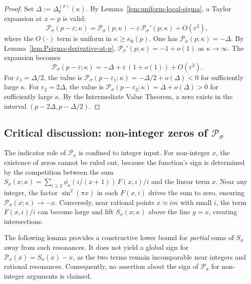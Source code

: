 \documentclass[11pt,a4paper]{amsart}
\theoremstyle{plain}
\theoremstyle{definition}
\theoremstyle{remark}
\begin{document}
\begin{proof}
Set $\Delta:=\Delta_p^{(\sigma)}(\kappa)$. By Lemma~\ref{lem:uniform-local-sigma}, a Taylor expansion at $x=p$ is valid:
\[
\mathcal P_\sigma(p-\varepsilon;\kappa)=\mathcal P_\sigma(p;\kappa) - \varepsilon\,\mathcal P_\sigma'(p;\kappa) + O(\varepsilon^2),
\]
where the $O(\cdot)$ term is uniform in $\kappa\ge\kappa_0(p)$. One has $\mathcal P_\sigma(p;\kappa)=-\Delta$. By Lemma~\ref{lem:Psigma-derivative-at-p}, $\mathcal P_\sigma'(p;\kappa)=-1+o(1)$ as $\kappa\to\infty$. The expansion becomes
\[
\mathcal P_\sigma(p-\varepsilon;\kappa)=-\Delta + \varepsilon\,(1+o(1)) + O(\varepsilon^2).
\]
For $\varepsilon_1=\Delta/2$, the value is $\mathcal P_\sigma(p-\varepsilon_1;\kappa)=-\Delta/2+o(\Delta)<0$ for sufficiently large $\kappa$.
For $\varepsilon_2=2\Delta$, the value is $\mathcal P_\sigma(p-\varepsilon_2;\kappa)=\Delta+o(\Delta)>0$ for sufficiently large $\kappa$.
By the Intermediate Value Theorem, a zero exists in the interval $(p-2\Delta, p-\Delta/2)$.
\end{proof}


\subsection{Critical discussion: non-integer zeros of $\mathcal{P}_{\sigma}$}
The indicator role of $\mathcal{P}_{\sigma}$ is confined to integer input. For non-integer $x$, the existence of zeros cannot be ruled out, because the function's sign is determined by the competition between the sum $S_{\sigma}(x;\kappa) = \sum_{i\ge2}\phi_{\kappa}(i/(x+1))\,F(x,i)/i$ and the linear term $x$. Near any integer, the factor $\sin^2(\pi x)$ in each $F(x,i)$ drives the sum to zero, ensuring $\mathcal{P}_{\sigma}(x;\kappa) \to -x$. Conversely, near rational points $x \approx im$ with small $i$, the term $F(x,i)/i$ can become large and lift $S_{\sigma}(x;\kappa)$ above the line $y=x$, creating intersections.

The following lemma provides a constructive lower bound for \emph{partial} sums of $S_{\sigma}$ away from such resonances. It does not yield a global sign for $\mathcal{P}_\sigma(x)=S_\sigma(x)-x$, as the two terms remain incomparable near integers and rational resonances. Consequently, no assertion about the sign of $\mathcal{P}_\sigma$ for non-integer arguments is claimed.
\end{document}
